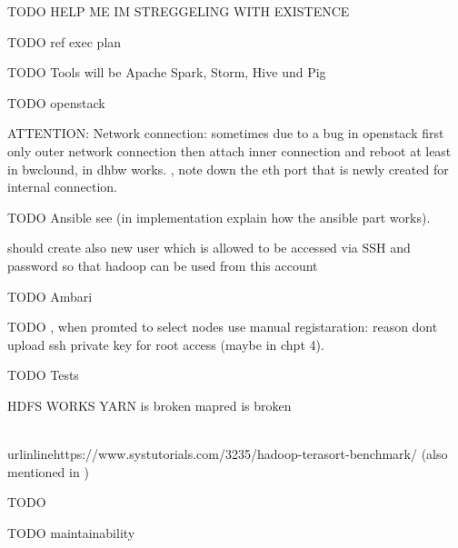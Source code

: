 TODO HELP ME IM STREGGELING WITH EXISTENCE



TODO ref exec plan

TODO Tools will be Apache Spark, Storm, Hive und Pig

TODO openstack

    ATTENTION: Network connection: sometimes due to a bug in openstack first only outer network connection then attach inner connection and reboot at least in bwclound, in dhbw works. 
    , note down the eth port that is newly created for internal connection.
    


TODO Ansible
see 
     (in implementation explain how the ansible part works). 
     
     should create also new user which is allowed to be accessed via SSH and  password so that hadoop can be used from this account

TODO Ambari

    TODO ,  when promted to select nodes use manual registaration: reason dont upload ssh private key for root access (maybe in chpt 4).

TODO Tests

HDFS WORKS
YARN is broken
mapred is broken



\\urlinline{https://www.systutorials.com/3235/hadoop-terasort-benchmark/} (also mentioned in \autocite[][]{white2015hadoop})



TODO

TODO maintainability
